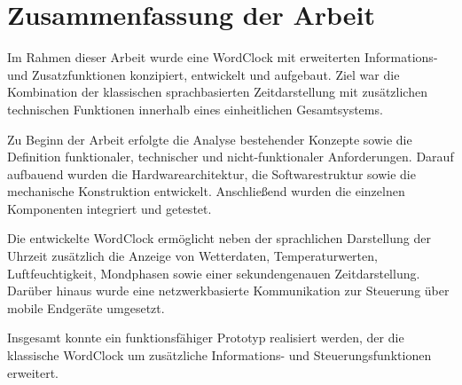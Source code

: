 \section{Zusammenfassung der Arbeit}
Im Rahmen dieser Arbeit wurde eine WordClock mit erweiterten Informations- und Zusatzfunktionen konzipiert, entwickelt und aufgebaut.  
Ziel war die Kombination der klassischen sprachbasierten Zeitdarstellung mit zusätzlichen technischen Funktionen innerhalb eines einheitlichen Gesamtsystems.  

Zu Beginn der Arbeit erfolgte die Analyse bestehender Konzepte sowie die Definition funktionaler, technischer und nicht-funktionaler Anforderungen.  
Darauf aufbauend wurden die Hardwarearchitektur, die Softwarestruktur sowie die mechanische Konstruktion entwickelt.  
Anschließend wurden die einzelnen Komponenten integriert und getestet.  

Die entwickelte WordClock ermöglicht neben der sprachlichen Darstellung der Uhrzeit zusätzlich die Anzeige von Wetterdaten, Temperaturwerten, Luftfeuchtigkeit, Mondphasen sowie einer sekundengenauen Zeitdarstellung.  
Darüber hinaus wurde eine netzwerkbasierte Kommunikation zur Steuerung über mobile Endgeräte umgesetzt.  

Insgesamt konnte ein funktionsfähiger Prototyp realisiert werden, der die klassische WordClock um zusätzliche Informations- und Steuerungsfunktionen erweitert.